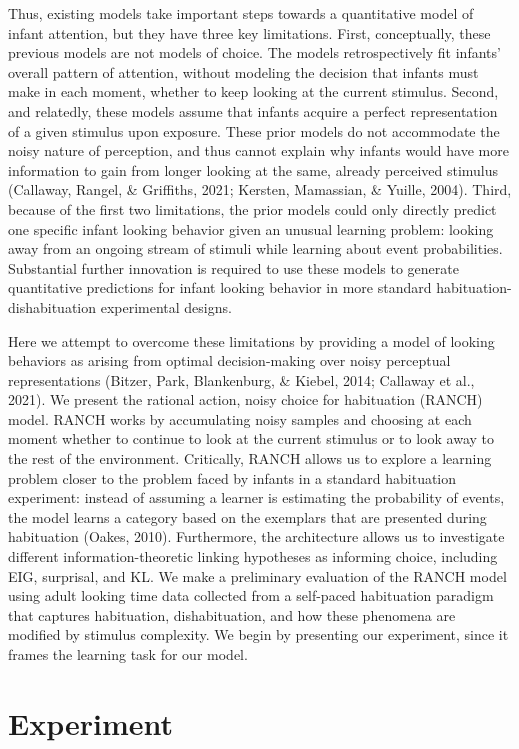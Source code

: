 \documentclass[10pt, letterpaper]{article}
\begin{document}
Thus, existing models take important steps towards a quantitative model
of infant attention, but they have three key limitations. First,
conceptually, these previous models are not models of choice. The models
retrospectively fit infants' overall pattern of attention, without
modeling the decision that infants must make in each moment, whether to
keep looking at the current stimulus. Second, and relatedly, these
models assume that infants acquire a perfect representation of a given
stimulus upon exposure. These prior models do not accommodate the noisy
nature of perception, and thus cannot explain why infants would have
more information to gain from longer looking at the same, already
perceived stimulus (Callaway, Rangel, \& Griffiths, 2021; Kersten,
Mamassian, \& Yuille, 2004). Third, because of the first two
limitations, the prior models could only directly predict one specific
infant looking behavior given an unusual learning problem: looking away
from an ongoing stream of stimuli while learning about event
probabilities. Substantial further innovation is required to use these
models to generate quantitative predictions for infant looking behavior
in more standard habituation-dishabituation experimental designs.

Here we attempt to overcome these limitations by providing a model of
looking behaviors as arising from optimal decision-making over noisy
perceptual representations (Bitzer, Park, Blankenburg, \& Kiebel, 2014;
Callaway et al., 2021). We present the rational action, noisy choice for
habituation (RANCH) model. RANCH works by accumulating noisy samples and
choosing at each moment whether to continue to look at the current
stimulus or to look away to the rest of the environment. Critically,
RANCH allows us to explore a learning problem closer to the problem
faced by infants in a standard habituation experiment: instead of
assuming a learner is estimating the probability of events, the model
learns a category based on the exemplars that are presented during
habituation (Oakes, 2010). Furthermore, the architecture allows us to
investigate different information-theoretic linking hypotheses as
informing choice, including EIG, surprisal, and KL. We make a
preliminary evaluation of the RANCH model using adult looking time data
collected from a self-paced habituation paradigm that captures
habituation, dishabituation, and how these phenomena are modified by
stimulus complexity. We begin by presenting our experiment, since it
frames the learning task for our model.

\hypertarget{experiment}{%
\section{Experiment}\label{experiment}}
\end{document}
